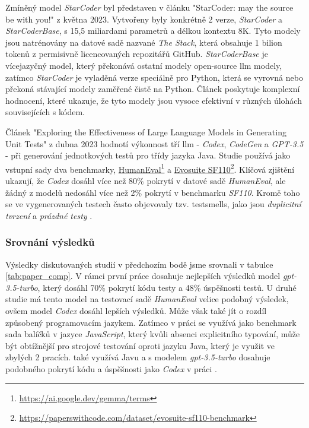 \documentclass[czech, ma, kiv, he, iso690alph, pdf, viewonly]{fasthesis}
\begin{document}
    Zmíněný model \emph{StarCoder} byl představen v článku "StarCoder: may the source be with you!" \cite{StarCoder2023} z května 2023. Vytvořeny byly konkrétně 2 verze, \textit{StarCoder} a \textit{StarCoderBase}, s 15,5 miliardami parametrů a délkou kontextu 8K. Tyto modely jsou natrénovány na datové sadě nazvané \textit{The Stack}, která obsahuje 1 bilion tokenů z permisivně licencovaných repozitářů GitHub. \textit{StarCoderBase} je vícejazyčný model, který překonává ostatní modely open-source \gls{llm} modely, zatímco \textit{StarCoder} je vyladěná verze speciálně pro Python, která se vyrovná nebo překoná stávající modely zaměřené čistě na Python. Článek poskytuje komplexní hodnocení, které ukazuje, že tyto modely jsou vysoce efektivní v různých úlohách souvisejících s kódem.

    Článek "Exploring the Effectiveness of Large Language Models in Generating Unit Tests" \cite{siddiq2023exploring} z dubna 2023 hodnotí výkonnost tří \gls{llm} - \textit{Codex}, \textit{CodeGen} a \textit{GPT-3.5} - při generování jednotkových testů pro třídy jazyka Java. Studie používá jako vstupní sady dva benchmarky, \href{https://paperswithcode.com/dataset/humaneval-x}{HumanEval}\footnote{\url{https://ai.google.dev/gemma/terms}} a \href{https://paperswithcode.com/dataset/evosuite-sf110-benchmark}{Evosuite SF110}\footnote{\url{https://paperswithcode.com/dataset/evosuite-sf110-benchmark}}. Klíčová zjištění ukazují, že \textit{Codex} dosáhl více než 80\% pokrytí v datové sadě \textit{HumanEval}, ale žádný z modelů nedosáhl více než 2\% pokrytí v benchmarku \textit{SF110}. Kromě toho se ve vygenerovaných testech často objevovaly tzv. \gls{testsmells}, jako jsou \textit{duplicitní tvrzení} a \textit{prázdné testy} \cite{testsmells}.

    \subsubsection{Srovnání výsledků}
    Výsledky diskutovaných studií v předchozím bodě jsme srovnali v tabulce \ref{tab:paper_comp}. V rámci první práce dosahuje nejlepších výsledků model \textit{gpt-3.5-turbo}, který dosáhl 70\% pokrytí kódu testy a 48\% úspěšnosti testů. U druhé studie má tento model na testovací sadě \textit{HumanEval} velice podobný výsledek, ovšem model \textit{Codex} dosáhl lepších výsledků. Může však také jít o rozdíl způsobený programovacím jazykem. Zatímco v práci \cite{schafer2023empirical} se využívá jako benchmark sada balíčků v jazyce \textit{JavaScript}, který kvůli absenci explicitního typování, může být obtížnější pro strojové testování oproti jazyku Java, který je využit ve zbylých 2 pracích. \cite{jutai} také využívá Javu a s modelem \textit{gpt-3.5-turbo} dosahuje podobného pokrytí kódu a úspěšnosti jako \textit{Codex} v práci \cite{siddiq2023exploring}.
\end{document}

